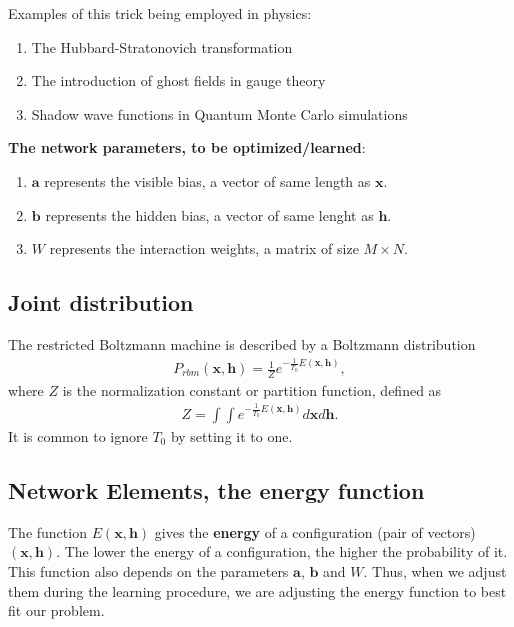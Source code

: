 \documentclass[aip,jcp,reprint,floatfix]{revtex4-1}
\begin{document}
\begin{itemize}
Examples of this trick being employed in physics: 
\begin{enumerate}
 \item The Hubbard-Stratonovich transformation

 \item The introduction of ghost fields in gauge theory

 \item Shadow wave functions in Quantum Monte Carlo simulations
\end{enumerate}

\noindent
\textbf{The network parameters, to be optimized/learned}:
\begin{enumerate}
 \item $\mathbf{a}$ represents the visible bias, a vector of same length as $\mathbf{x}$.

 \item $\mathbf{b}$ represents the hidden bias, a vector of same lenght as $\mathbf{h}$.

 \item $W$ represents the interaction weights, a matrix of size $M\times N$.
\end{enumerate}

\noindent
\subsection*{Joint distribution}

The restricted Boltzmann machine is described by a Boltzmann distribution
\begin{align}
	P_{rbm}(\mathbf{x},\mathbf{h}) = \frac{1}{Z} e^{-\frac{1}{T_0}E(\mathbf{x},\mathbf{h})},
\end{align}
where $Z$ is the normalization constant or partition function, defined as 
\begin{align}
	Z = \int \int e^{-\frac{1}{T_0}E(\mathbf{x},\mathbf{h})} d\mathbf{x} d\mathbf{h}.
\end{align}
It is common to ignore $T_0$ by setting it to one. 




\subsection*{Network Elements, the energy function}

The function $E(\mathbf{x},\mathbf{h})$ gives the \textbf{energy} of a
configuration (pair of vectors) $(\mathbf{x}, \mathbf{h})$. The lower
the energy of a configuration, the higher the probability of it. This
function also depends on the parameters $\mathbf{a}$, $\mathbf{b}$ and
$W$. Thus, when we adjust them during the learning procedure, we are
adjusting the energy function to best fit our problem.


\end{itemize}
\end{document}
